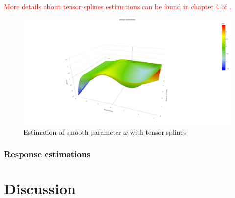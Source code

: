 \documentclass[11pt]{article}
\newcommand {\1}{\mathbb{1}}
\begin{document}
\textcolor{red}{More details about tensor splines estimations can be found in chapter 4 of \cite{wood_generalized_2017}.}

\begin{figure}[H]
	\centering
	\includegraphics[width=0.7\linewidth]{images/constrained_models/omega_estimations}
	\caption{Estimation of smooth parameter $\omega$ with tensor splines}
	\label{fig:omegaestimations}
\end{figure}



\subsubsection{Response estimations}

\section{Discussion}
\end{document}
